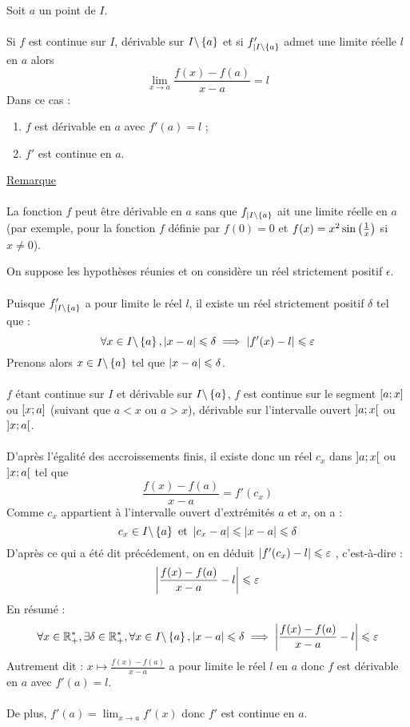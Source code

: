 \begin{theo}
    Soit \(a\) un point de \(I\).\\~\\
    Si \(f\) est continue sur \(I\), dérivable sur \(I \backslash \left\lbrace a\right\rbrace\) et si \(f' _{|I\backslash\left\lbrace a\right\rbrace}\) admet une limite réelle \(l\) en \(a\) alors
    \[\lim _{x\to a} \frac{f (x) - f (a)}{ x - a }= l\]
    Dans ce cas :
    \begin{enumerate}
        \item \(f\) est dérivable en \(a\) avec \(f '(a) = l\) ;
        \item \(f '\) est continue en \(a\).
    \end{enumerate}
    \underline{Remarque}\\~\\
    La fonction \(f\) peut être dérivable en \(a\) sans que \(f _{|I\backslash\left\lbrace a\right\rbrace}\) ait une limite réelle en \(a\) (par exemple, pour la fonction \(f\) définie par \(f (0) = 0\) et \(f (x) = x^2 \sin \left(\frac{1}{x}\right)\) si \(x\neq 0\)).
\end{theo}

\begin{dem}
    On suppose les hypothèses réunies et on considère un réel strictement positif \(\epsilon\). \\~\\
    Puisque \(f '_{|I\backslash\left\lbrace a\right\rbrace}\) a pour limite le réel \(l\), il existe un réel strictement positif \(\delta\) tel que :
    \[\forall x \in I \backslash \left\lbrace a\right\rbrace , \left\lvert x - a\right\rvert \leqslant \delta \implies \left\lvert f '(x) - l\right\rvert \leqslant \varepsilon\]
    Prenons alors \(x \in I \backslash \left\lbrace a\right\rbrace\) tel que \(\left\lvert x - a\right\rvert \leqslant \delta\).\\~\\
    \(f\) étant continue sur \(I\) et dérivable sur \(I \backslash \left\lbrace a\right\rbrace\), \(f\) est continue sur le segment \(\left[a;x\right]\) ou \(\left[x;a\right]\) (suivant que \(a < x\) ou \(a > x\)), dérivable sur l’intervalle ouvert \(\left]a;x\right[\) ou \(\left]x;a\right[\).\\~\\
    D’après l’égalité des accroissements finis, il existe donc un réel \(c_x\) dans \(\left]a;x\right[\) ou \(\left]x;a\right[\) tel que
    \[\frac{f(x)-f(a)}{x-a} = f'(c_x)\]
    Comme \(c_x\) appartient à l’intervalle ouvert d’extrémités \(a\) et \(x\), on a :
    \[c_x \in I \backslash \left\lbrace a\right\rbrace\text{ et } \left\lvert c_x - a\right\rvert \leqslant \left\lvert x - a\right\rvert \leqslant \delta\]
    D’après ce qui a été dit précédement, on en déduit \(\left\lvert f '(c_x) - l\right\rvert \leqslant \varepsilon\) , c’est-à-dire :
    \[\left\lvert\frac{f(x) - f(a)}{x-a} - l\right\rvert\leqslant \varepsilon\]
    En résumé : 
    \[\forall x \in \mathbb{R}_+^*, \exists \delta \in \mathbb{R}_+^*, \forall x \in I \backslash \left\lbrace a\right\rbrace, \left\lvert x-a\right\rvert\leqslant \delta \implies \left\lvert\frac{f(x) - f(a)}{x-a} - l\right\rvert\leqslant \varepsilon\]
    Autrement dit : \(x \mapsto \frac{f (x) - f (a)}{ x - a}\) a pour limite le réel \(l\) en \(a\) donc \(f\) est dérivable en \(a\) avec \(f'(a) = l\).\\~\\
    De plus, \(f '(a) = \lim _{x\to a} f '(x)\) donc \(f '\) est continue en \(a\).
\end{dem}

